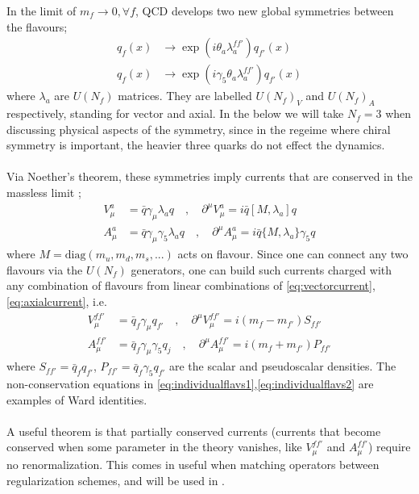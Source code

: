 In the limit of $m_f\to 0,\forall f$, QCD develops two new global symmetries between the flavours;
\begin{align}
  q_f(x) &\to \exp(i\theta_a \lambda^{ff'}_a) q_{f'}(x) \\
  q_f(x) &\to \exp(i\gamma_5 \theta_a \lambda^{ff'}_a) q_{f'}(x)
\end{align}
where $\lambda_a$ are $U(N_f)$ matrices. They are labelled $U(N_f)_V$ and $U(N_f)_A$ respectively, standing for vector and axial. {} In the below we will take $N_f=3$ when discussing physical aspects of the symmetry, since in the regeime where chiral symmetry is important, the heavier three quarks do not effect the dynamics.
\\ \\
Via Noether's theorem, these symmetries imply currents that are conserved in the massless limit \cite{Scherer:2002tk};
\begin{align}
    \label{eq:vectorcurrent}
  V_{\mu}^a &= \bar{q} \gamma_{\mu} \lambda_a q \quad,\quad \partial^{\mu}V_{\mu}^a = i \bar{q} [ M, \lambda_a ] q \\
  A_{\mu}^a &= \bar{q} \gamma_{\mu} \gamma_5 \lambda_a q \quad,\quad \partial^{\mu}A_{\mu}^a = i \bar{q} \{ M, \lambda_a \}\gamma_5 q
  \label{eq:axialcurrent}
\end{align}
where $M = \text{diag}(m_u,m_d,m_s,...)$ acts on flavour. Since one can connect any two flavours via the $U(N_f)$ generators, one can build such currents charged with any combination of flavours from linear combinations of \eqref{eq:vectorcurrent},\eqref{eq:axialcurrent}, i.e.
\begin{align}
	\label{eq:individualflavs1}
	V_{\mu}^{ff'} &= \bar{q}_f \gamma_{\mu} q_{f'} \quad,\quad \partial^{\mu}V_{\mu}^{ff'} = i (m_f - m_{f'}) S_{ff'} \\
	  A_{\mu}^{ff'} &= \bar{q}_f \gamma_{\mu} \gamma_5 q_j \quad,\quad \partial^{\mu}A_{\mu}^{ff'} = i (m_f+m_{f'})P_{ff'}
	\label{eq:individualflavs2}
\end{align}
where $S_{ff'} = \bar{q}_f q_{f'}$, $P_{ff'} = \bar{q}_f \gamma_5 q_{f'}$ are the scalar and pseudoscalar densities. The non-conservation equations in \eqref{eq:individualflavs1},\eqref{eq:individualflavs2} are examples of Ward identities.
\\ \\
A useful theorem \cite{Fubini:1964boa} is that partially conserved currents (currents that become conserved when some parameter in the theory vanishes, like $V_{\mu}^{ff'}$ and $A_{\mu}^{ff'}$) require no renormalization. This comes in useful when matching operators between regularization schemes, and will be used in {\color{red}{chapter N}}.
\\ \\
